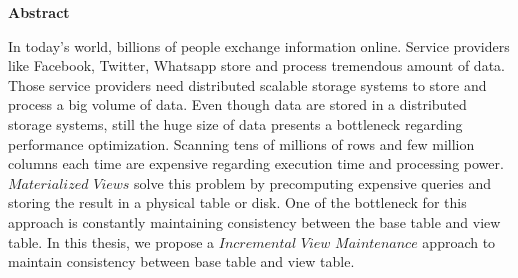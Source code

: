 

\clearemptydoublepage
{}
{}	





\vspace*{2cm}
\begin{center}
{\Large \bf Abstract}
\end{center}
\vspace{1cm}



In today's world, billions of people exchange information online. Service providers like Facebook, Twitter, Whatsapp store and process tremendous amount of data. Those service providers need distributed scalable storage systems to store and process a big volume of data. Even though data are stored in a distributed storage systems, still the huge size of data presents a bottleneck regarding performance optimization. Scanning tens of millions of rows and few million columns each time are expensive regarding execution time and processing power. $Materialized$ $Views$ solve this problem by precomputing expensive queries and storing the result in a physical table or disk. One of the bottleneck for this approach is constantly maintaining consistency between the base table and view table. In this thesis, we propose a $Incremental$ $View$ $Maintenance$ approach to maintain consistency between base table and view table.